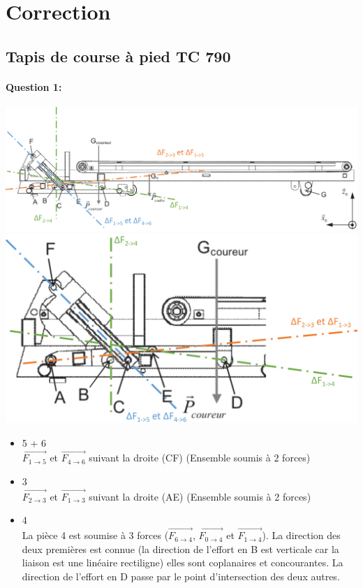 \clearpage

\pagestyle{correction}

\newpage

\section{Correction}

\subsection{Tapis de course à pied TC 790}

\paragraph{Question 1:}

\begin{center}
 \includegraphics[width=0.9\linewidth]{img/tapis_cor1} \\
 \includegraphics[width=0.6\linewidth]{img/tapis_cor2}
\end{center}

\begin{itemize}
\item 5 + 6 \\
$\overrightarrow{F_{1\rightarrow 5}}$ et $\overrightarrow{F_{4\rightarrow 6}}$ suivant la droite (CF) (Ensemble soumis à 2 forces) \\
\item 3 \\
$\overrightarrow{F_{2\rightarrow 3}}$ et $\overrightarrow{F_{1\rightarrow 3}}$ suivant la droite (AE) (Ensemble soumis à 2 forces) \\
\item 4 \\
La pièce 4 est soumise à 3 forces ($\overrightarrow{F_{6\rightarrow 4}}$, $\overrightarrow{F_{0\rightarrow 4}}$ et $\overrightarrow{F_{1\rightarrow 4}}$). La direction des deux premières est connue (la direction de l'effort en B est verticale car la liaison est une linéaire rectiligne) elles sont coplanaires et concourantes. La direction de l'effort en D passe par le point d'intersection des deux autres.
\end{itemize}

